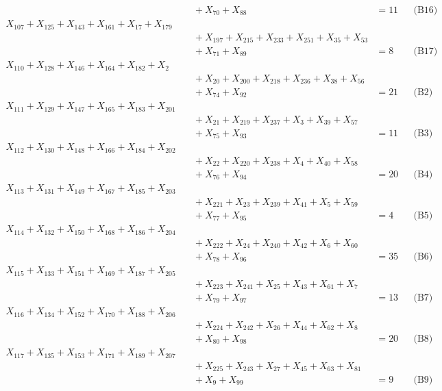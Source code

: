 \documentclass[a4paper,10pt]{article}
\begin{document}
{\begin{align}
&\quad  + X_{70} + X_{88} &= 11 && \text{(B16)} \\
X_{107} + X_{125} + X_{143} + X_{161} + X_{17} + X_{179} \\[0.5ex]
&\quad  + X_{197} + X_{215} + X_{233} + X_{251} + X_{35} + X_{53} \\[0.5ex]
&\quad  + X_{71} + X_{89} &= 8 && \text{(B17)} \\
X_{110} + X_{128} + X_{146} + X_{164} + X_{182} + X_{2} \\[0.5ex]
&\quad  + X_{20} + X_{200} + X_{218} + X_{236} + X_{38} + X_{56} \\[0.5ex]
&\quad  + X_{74} + X_{92} &= 21 && \text{(B2)} \\
X_{111} + X_{129} + X_{147} + X_{165} + X_{183} + X_{201} \\[0.5ex]
&\quad  + X_{21} + X_{219} + X_{237} + X_{3} + X_{39} + X_{57} \\[0.5ex]
&\quad  + X_{75} + X_{93} &= 11 && \text{(B3)} \\
X_{112} + X_{130} + X_{148} + X_{166} + X_{184} + X_{202} \\[0.5ex]
&\quad  + X_{22} + X_{220} + X_{238} + X_{4} + X_{40} + X_{58} \\[0.5ex]
&\quad  + X_{76} + X_{94} &= 20 && \text{(B4)} \\
X_{113} + X_{131} + X_{149} + X_{167} + X_{185} + X_{203} \\[0.5ex]
&\quad  + X_{221} + X_{23} + X_{239} + X_{41} + X_{5} + X_{59} \\[0.5ex]
&\quad  + X_{77} + X_{95} &= 4 && \text{(B5)} \\
X_{114} + X_{132} + X_{150} + X_{168} + X_{186} + X_{204} \\[0.5ex]
&\quad  + X_{222} + X_{24} + X_{240} + X_{42} + X_{6} + X_{60} \\[0.5ex]
&\quad  + X_{78} + X_{96} &= 35 && \text{(B6)} \\
X_{115} + X_{133} + X_{151} + X_{169} + X_{187} + X_{205} \\[0.5ex]
&\quad  + X_{223} + X_{241} + X_{25} + X_{43} + X_{61} + X_{7} \\[0.5ex]
&\quad  + X_{79} + X_{97} &= 13 && \text{(B7)} \\
X_{116} + X_{134} + X_{152} + X_{170} + X_{188} + X_{206} \\[0.5ex]
&\quad  + X_{224} + X_{242} + X_{26} + X_{44} + X_{62} + X_{8} \\[0.5ex]
&\quad  + X_{80} + X_{98} &= 20 && \text{(B8)} \\
X_{117} + X_{135} + X_{153} + X_{171} + X_{189} + X_{207} \\[0.5ex]
&\quad  + X_{225} + X_{243} + X_{27} + X_{45} + X_{63} + X_{81} \\[0.5ex]
&\quad  + X_{9} + X_{99} &= 9 && \text{(B9)} \\
\end{align}}
\end{document}
